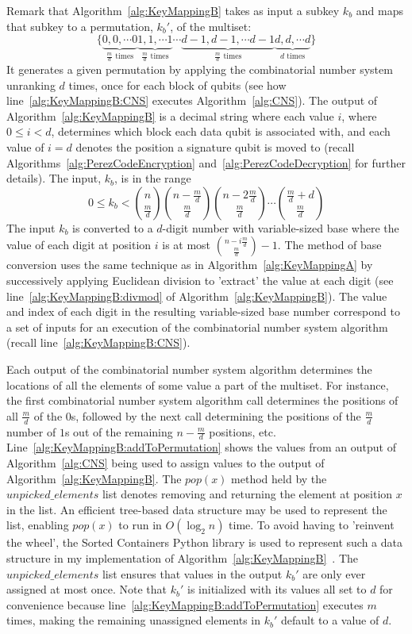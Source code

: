 Remark that Algorithm~\ref{alg:KeyMappingB} takes as input a subkey $k_b$ and maps that subkey to a permutation, $k_b'$, of the multiset:
\begin{equation}
    \{\underbrace{0, 0, \cdots 0}_{\frac{m}{d} \text{ times}}\underbrace{1, 1, \cdots 1}_{\frac{m}{d} \text{ times}}\cdots\underbrace{d-1, d-1, \cdots d-1}_{\frac{m}{d} \text{ times}}\underbrace{d, d, \cdots d}_{d \text{ times}}\}
\end{equation}
It generates a given permutation by applying the combinatorial number system unranking $d$ times, once for each block of qubits (see how line~\ref{alg:KeyMappingB:CNS} executes Algorithm~\ref{alg:CNS}). The output of Algorithm~\ref{alg:KeyMappingB} is a decimal string where each value $i$, where $0 \leq i < d$, determines which block each data qubit is associated with, and each value of $i = d$ denotes the position a signature qubit is moved to (recall Algorithms~\ref{alg:PerezCodeEncryption} and~\ref{alg:PerezCodeDecryption} for further details). 
The input, $k_b$, is in the range $$0 \leq k_b < {n \choose \frac{m}{d}}{n - \frac{m}{d} \choose \frac{m}{d}}{n - 2\frac{m}{d} \choose \frac{m}{d}}\cdots{\frac{m}{d} + d \choose \frac{m}{d}}$$ The input $k_b$ is converted to a $d$-digit number with variable-sized base where the value of each digit at position $i$ is at most ${n - i\frac{m}{d} \choose \frac{m}{d}} - 1$. The method of base conversion uses the same technique as in Algorithm~\ref{alg:KeyMappingA} by successively applying Euclidean division to 'extract' the value at each digit (see line~\ref{alg:KeyMappingB:divmod} of Algorithm~\ref{alg:KeyMappingB}). The value and index of each digit in the resulting variable-sized base number correspond to a set of inputs for an execution of the combinatorial number system algorithm (recall line~\ref{alg:KeyMappingB:CNS}). 

Each output of the combinatorial number system algorithm determines the locations of all the elements of some value a part of the multiset. For instance, the first combinatorial number system algorithm call determines the positions of all $\frac{m}{d}$ of the $0$s, followed by the next call determining the positions of the $\frac{m}{d}$ number of $1$s out of the remaining $n - \frac{m}{d}$ positions, etc. Line~\ref{alg:KeyMappingB:addToPermutation} shows the values from an output of Algorithm~\ref{alg:CNS} being used to assign values to the output of Algorithm~\ref{alg:KeyMappingB}. The $\mathit{pop}(x)$ method held by the $\mathit{unpicked\_elements}$ list denotes removing and returning the element at position $x$ in the list. An efficient tree-based data structure may be used to represent the list, enabling $\mathit{pop}(x)$ to run in $O\left(\log_2 n\right)$ time. To avoid having to 'reinvent the wheel', the Sorted Containers Python library is used to represent such a data structure in my implementation of Algorithm~\ref{alg:KeyMappingB}~\cite{sortedContainers}. The $\mathit{unpicked\_elements}$ list ensures that values in the output $k_b'$ are only ever assigned at most once. Note that $k_b'$ is initialized with its values all set to $d$ for convenience because line~\ref{alg:KeyMappingB:addToPermutation} executes $m$ times, making the remaining unassigned elements in $k_b'$ default to a value of $d$.

